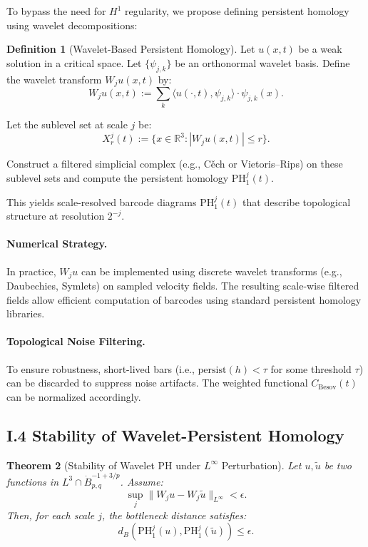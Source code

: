 \documentclass[11pt]{article}
\newtheorem{theorem}{Theorem}[section]
\theoremstyle{definition}
\newtheorem{definition}[theorem]{Definition}
\begin{document}
To bypass the need for $H^1$ regularity, we propose defining persistent homology using wavelet decompositions:

\begin{definition}[Wavelet-Based Persistent Homology]
Let $u(x,t)$ be a weak solution in a critical space. Let $\{\psi_{j,k}\}$ be an orthonormal wavelet basis. Define the wavelet transform $W_j u(x,t)$ by:
\[ W_j u(x,t) := \sum_k \langle u(\cdot, t), \psi_{j,k} \rangle \cdot \psi_{j,k}(x). \]

Let the sublevel set at scale $j$ be:
\[ X_r^j(t) := \{x \in \mathbb{R}^3 : |W_j u(x,t)| \leq r\}. \]

Construct a filtered simplicial complex (e.g., C\v{e}ch or Vietoris--Rips) on these sublevel sets and compute the persistent homology $\mathrm{PH}_1^j(t)$.
\end{definition}

This yields scale-resolved barcode diagrams $\mathrm{PH}_1^j(t)$ that describe topological structure at resolution $2^{-j}$.

\paragraph{Numerical Strategy.} In practice, $W_j u$ can be implemented using discrete wavelet transforms (e.g., Daubechies, Symlets) on sampled velocity fields. The resulting scale-wise filtered fields allow efficient computation of barcodes using standard persistent homology libraries.

\paragraph{Topological Noise Filtering.} To ensure robustness, short-lived bars (i.e., $\mathrm{persist}(h) < \tau$ for some threshold $\tau$) can be discarded to suppress noise artifacts. The weighted functional $C_{\text{Besov}}(t)$ can be normalized accordingly.

\subsection*{I.4 Stability of Wavelet-Persistent Homology}

\begin{theorem}[Stability of Wavelet PH under $L^\infty$ Perturbation]
Let $u, \tilde{u}$ be two functions in $L^3 \cap \dot{B}^{-1+3/p}_{p,q}$. Assume:
\[ \sup_j \|W_j u - W_j \tilde{u}\|_{L^\infty} < \epsilon. \]
Then, for each scale $j$, the bottleneck distance satisfies:
\[ d_B(\mathrm{PH}_1^j(u), \mathrm{PH}_1^j(\tilde{u})) \leq \epsilon. \]
\end{theorem}
\end{document}
